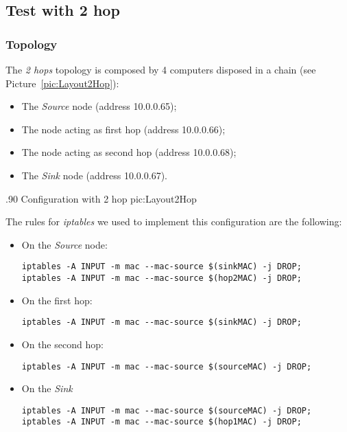 \subsection{Test with 2 hop} \label{subsec:2hop}

    \subsubsection{Topology}

        The \emph{2 hops} topology is composed by 4 computers disposed
        in a chain (see Picture~\ref{pic:Layout2Hop}):
        \begin{itemize}
        \item   The \emph{Source} node (address 10.0.0.65);
        \item   The node acting as first hop (address 10.0.0.66);
        \item   The node acting as second hop (address 10.0.0.68);
        \item   The \emph{Sink} node (address 10.0.0.67).
        \end{itemize}

                {.90\columnwidth}
                {Configuration with 2 hop}
                {pic:Layout2Hop}

        \noindent The rules for \emph{iptables} we used to implement this
        configuration are the following:

        \begin{itemize}
        \item On the \emph{Source} node:
        \begin{verbatim}
iptables -A INPUT -m mac --mac-source $(sinkMAC) -j DROP;
iptables -A INPUT -m mac --mac-source $(hop2MAC) -j DROP;
        \end{verbatim}

        \item On the first hop:
        \begin{verbatim}
iptables -A INPUT -m mac --mac-source $(sinkMAC) -j DROP;
        \end{verbatim}

        \item On the second hop:
        \begin{verbatim}
iptables -A INPUT -m mac --mac-source $(sourceMAC) -j DROP;
        \end{verbatim}

        \item On the \emph{Sink}
        \begin{verbatim}
iptables -A INPUT -m mac --mac-source $(sourceMAC) -j DROP;
iptables -A INPUT -m mac --mac-source $(hop1MAC) -j DROP;
        \end{verbatim}

        \end{itemize}

